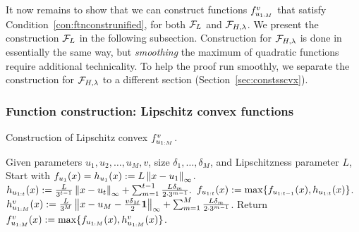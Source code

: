 It now remains to show that we can construct functions $f_{u_{1:M}}^v$ that satisfy Condition~\ref{con:ftnconstrunified}, for both $\mathcal{F}_{L}$ and $\mathcal{F}_{H,\lambda}$.
We present the construction $\mathcal{F}_{L}$ in the following subsection. 
Construction for $\mathcal{F}_{H,\lambda}$ is done in essentially the same way, but \emph{smoothing} the maximum of quadratic functions require additional technicality. To help the proof run smoothly, we separate the construction for $\mathcal{F}_{H,\lambda}$ to a different section (Section~\ref{sec:constsscvx}).

\subsubsection{Function construction: Lipschitz convex functions}
\label{sec:multiconstlipcvx}
\label{sec:constLipcvx}

\begin{algorithm}[t]
	\caption{Construction of Lipschitz convex $f_{u_{1:M}}^v$.}  \label{alg:ftnconstrLipsconv}
	\begin{algorithmic}[1]  %
		\STATEx Given parameters $u_1, u_2, \dots, u_M, v$, size $\delta_1, \dots, \delta_M$, and Lipschitzness parameter $L$,
		\STATE Start with $f_{u_1} (x) = h_{u_1}(x) := L\left\|{x-u_1}\right\|_\infty$.
		\STATE $h_{u_{1:{t}}} (x) := \frac{L}{3^{t-1}} \left\|{x-u_{t}}\right\|_\infty + \sum_{m=1}^{t-1} \frac{L \delta_m}{2 \cdot 3^{m-1}}.$
		\STATE $f_{u_{1:{t}}} (x) := \max \{ f_{u_{1:{t-1}}} (x), h_{u_{1:{t}}} (x) \}$.
		\ENDFOR
		\STATE $h^{v}_{u_{1:M}} (x) := \frac{L}{3^M} \left\|{x-u_M-\frac{v \delta_M}{2} \mathbf{1}}\right\|_\infty 
		+ \sum_{m=1}^{M} \frac{L \delta_m}{2 \cdot 3^{m-1}}$. 
		\STATE Return $f_{u_{1:M}}^v(x) := \max \{ f_{u_{1:{M}}}(x), h^{v}_{u_{1:M}}(x) \}$.
	\end{algorithmic}
\end{algorithm}

